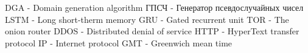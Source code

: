 DGA - Domain generation algorithm
ГПСЧ - Генератор псевдослучайных чисел
LSTM - Long short-therm memory
GRU - Gated recurrent unit
TOR - The onion router
DDOS - Distributed denial of service
HTTP - HyperText transfer protocol
IP - Internet protocol
GMT - Greenwich mean time
\clearpage